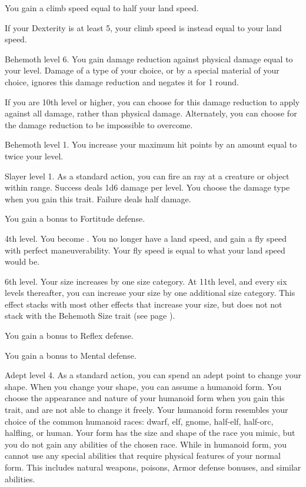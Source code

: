     \featben You gain a climb speed equal to half your land speed.

    If your Dexterity is at least 5, your climb speed is instead equal to your land speed.

    \featpre Behemoth level 6.
    \featben You gain damage reduction against physical damage equal to your level.
    Damage of a type of your choice, or by a special material of your choice, ignores this damage reduction and negates it for 1 round.

    If you are 10th level or higher, you can choose for this damage reduction to apply against all damage, rather than physical damage.
    Alternately, you can choose for the damage reduction to be impossible to overcome.

    \featpre Behemoth level 1.
    \featben You increase your maximum hit points by an amount equal to twice your level.

    \featpre Slayer level 1.
    \featben As a standard action, you can fire an ray at a creature or object within \rngclose range.
    Success deals 1d6 damage per level.
    You choose the damage type when you gain this trait.
    Failure deals half damage.

    \featben You gain a  bonus to Fortitude defense.

    \featpre 4th level.
    \featben You become .
    You no longer have a land speed, and gain a fly speed with perfect maneuverability.
    Your fly speed is equal to what your land speed would be.

    \featpre 6th level.
    \featben Your size increases by one size category.
    At 11th level, and every six levels thereafter, you can increase your size by one additional size category.
    This effect stacks with most other effects that increase your size, but does not not stack with the Behemoth Size trait (see page ).

    \featben You gain a  bonus to Reflex defense.

    \featben You gain a  bonus to Mental defense.

    \featpre Adept level 4.
    \featben As a standard action, you can spend an adept point to change your shape.
    When you change your shape, you can assume a humanoid form.
    You choose the appearance and nature of your humanoid form when you gain this trait, and are not able to change it freely.
    Your humanoid form resembles your choice of the common humanoid races: dwarf, elf, gnome, half-elf, half-orc, halfling, or human.
    Your form has the size and shape of the race you mimic, but you do not gain any abilities of the chosen race.
    While in humanoid form, you cannot use any special abilities that require physical features of your normal form.
    This includes natural weapons, poisons, Armor defense bonuses, and similar abilities.

